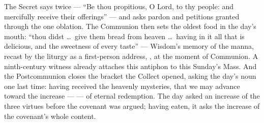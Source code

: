 The Secret says  twice --- ``Be thou propitious, O Lord, to
thy people: and mercifully receive their offerings'' --- and asks pardon and
petitions granted through the one oblation. The Communion then sets the
oldest food in the day's mouth: ``thou didst \dots\ give them bread from
heaven \dots\ having in it all that is delicious, and the sweetness of every
taste'' --- Wisdom's memory of the manna, recast by the liturgy as a
first-person address, , at the moment of
Communion. A ninth-century witness already attaches this antiphon to this
Sunday's Mass. And the Postcommunion closes the bracket the Collect opened,
asking the day's noun one last time: having received the heavenly mysteries,
that we may advance toward the increase ---  --- of eternal
redemption. The day asked an increase of the three virtues before the
covenant was argued; having eaten, it asks the increase of the covenant's
whole content.

\label{triptych:brief-synthesis:end}
\clearpage

